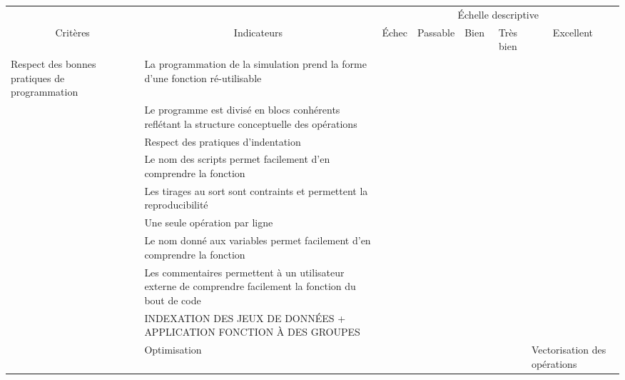 \begin{longtable}{lllllll}
  \hline
  \multicolumn{1}{|c|}{} &
    \multicolumn{1}{c|}{} &
    \multicolumn{5}{c|}{Échelle descriptive} \\ \cline{3-7} 
  \multicolumn{1}{|c|}{\multirow{-2}{*}{Critères}} &
    \multicolumn{1}{c|}{\multirow{-2}{*}{Indicateurs}} &
    \multicolumn{1}{c|}{Échec} &
    \multicolumn{1}{c|}{Passable} &
    \multicolumn{1}{c|}{Bien} &
    \multicolumn{1}{c|}{Très bien} &
    \multicolumn{1}{c|}{Excellent} \\ \hline
  \endfirsthead
  \endhead
  \hline
  \endfoot
  \endlastfoot
  Respect des bonnes pratiques de programmation &
    La programmation de la simulation prend la forme d'une fonction ré-utilisable &
    \multicolumn{1}{r}{} &
     &
     &
     &
     \\
   &
    Le programme est divisé en blocs conhérents reflétant la structure conceptuelle des opérations &
     &
     &
     &
     &
     \\
   &
    Respect des pratiques d'indentation &
     &
     &
     &
     &
     \\
   &
    Le nom des scripts permet facilement d'en comprendre la fonction &
     &
     &
     &
     &
     \\
   &
    Les tirages au sort sont contraints et permettent la reproducibilité &
     &
     &
     &
     &
     \\
   &
    Une seule opération par ligne &
     &
     &
     &
     &
     \\
   &
    Le nom donné aux variables permet facilement d'en comprendre la fonction &
     &
     &
     &
     &
     \\
   &
    Les commentaires permettent à un utilisateur externe de comprendre facilement la fonction du bout de code &
    \multicolumn{1}{r}{} &
     &
     &
     &
     \\
   &
    INDEXATION DES JEUX DE DONNÉES + APPLICATION FONCTION À DES GROUPES &
     &
     &
     &
     &
     \\
   &
    Optimisation &
     &
     &
     &
     &
    Vectorisation des opérations \\

\end{longtable}
